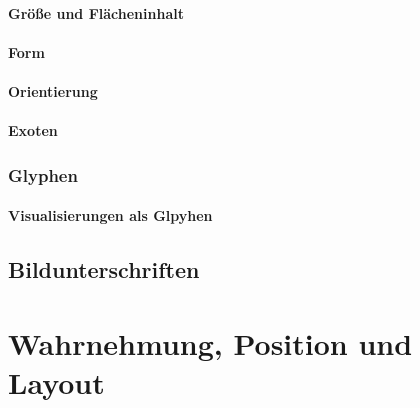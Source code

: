                 \paragraph{Größe und Flächeninhalt} %

                \paragraph{Form} %

                \paragraph{Orientierung} %

                \paragraph{Exoten} %

            \subsubsection{Glyphen} %

                \paragraph{Visualisierungen als Glpyhen} %

        \subsection{Bildunterschriften} %

    \section{Wahrnehmung, Position und Layout} %

